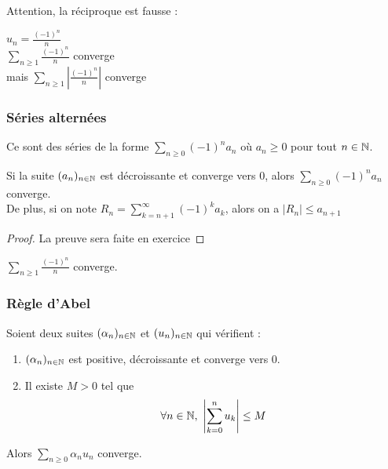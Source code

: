 \documentclass[../main.tex]{subfile}
\begin{document}
\begin{rema}
	Attention, la réciproque est fausse :\\
\begin{ex}	
	$u_n = \frac{(-1)^n}{n}$\\
	$\sum\limits_{n\geq 1} \frac{(-1)^n}{n}$ converge\\
	mais $\sum\limits_{n\geq 1} \left| \frac{(-1)^n}{n}\right|$ converge\\
\end{ex}
\end{rema}

\subsubsection{Séries alternées}
	Ce sont des séries de la forme $\sum\limits_{n \geq 0} (-1)^na_n$ où $a_n \geq 0$ pour tout $n \in \mathbb{N}$.

\begin{theo}	
	Si la suite $(a_n)_{n\in \mathbb{N}}$ est décroissante et converge vers $0$, alors $\sum\limits_{n \geq 0} (-1)^n a_n$ converge. \\
	De plus, si on note $R_n = \sum\limits_{k = n + 1}^{\infty} (-1)^ka_k$, 
	alors on a $|R_n| \leq a_{n+1}$
\end{theo}

\begin{proof}
	La preuve sera faite en exercice
\end{proof}

\begin{ex}
	$\sum\limits_{n\geq 1} \frac{(-1)^n}{n}$ converge.\\
\end{ex}

\subsubsection{Règle d'Abel}
\begin{theo}
	Soient deux suites $(\alpha_n)_{n \in \mathbb{N}}$ et $(u_n)_{n \in \mathbb{N}}$ qui vérifient :
\begin{enumerate}	
	\item $(\alpha_n)_{n \in \mathbb{N}}$ est positive, décroissante et converge vers $0$.
	\item Il existe $M > 0$ tel que 
	$$\forall n \in \mathbb{N}, \ \left| \sum\limits_{k = 0}^n u_k \right| \leq M$$
\end{enumerate}
	Alors $\sum\limits_{n \geq 0} \alpha_n u_n$ converge.
\end{theo}
\end{document}
